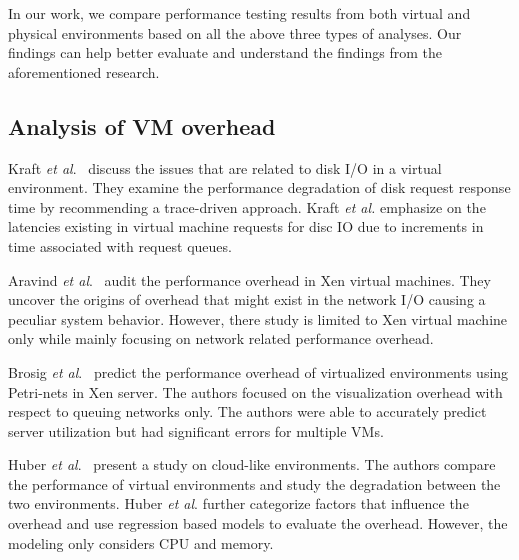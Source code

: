 In our work, we compare performance testing results from both virtual and physical environments based on all the above three types of analyses. Our findings can help better evaluate and understand the findings from the aforementioned research.


\subsection{Analysis of VM overhead}

Kraft \textit{et al$.$}~\cite{kraft2011io} discuss the issues that are related to disk I/O in a virtual environment. They examine the performance degradation of disk request response time by recommending a trace-driven approach. Kraft \textit{et al.} emphasize on the latencies existing in virtual machine requests for disc IO due to increments in time associated with request queues. 

Aravind \textit{et al$.$}~\cite{menon2005diagnosing} audit the performance overhead in Xen virtual machines. They uncover the origins of overhead that might exist in the network I/O causing a peculiar system behavior. However, there study is limited to Xen virtual machine only while mainly focusing on network related performance overhead.

Brosig \textit{et al$.$}~\cite{brosig2013evaluating} predict the performance overhead of virtualized environments using Petri-nets in Xen server. The authors focused on the visualization overhead with respect to queuing networks only. The authors were able to accurately predict server utilization but had significant errors for multiple VMs.


Huber \textit{et al$.$}~\cite{huber2011evaluating} present a study on cloud-like environments. The authors compare the performance of virtual environments and study the degradation between the two environments. Huber \textit{et al$.$} further categorize factors that influence the overhead and use regression based models to evaluate the overhead. However, the modeling only considers CPU and memory.

